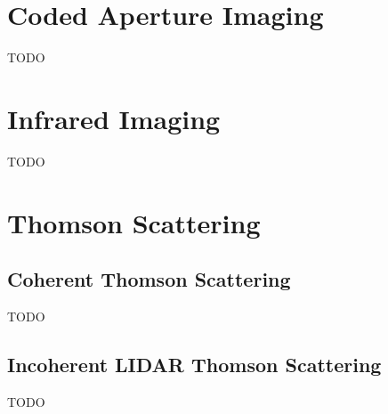 \documentclass{jpp}
\begin{document}
\section{Coded Aperture Imaging}

{\Large TODO \par}

\section{Infrared Imaging}

{\Large TODO \par}

\section{Thomson Scattering}

\subsection{Coherent Thomson Scattering}

{\Large TODO \par}

\subsection{Incoherent LIDAR Thomson Scattering}

{\Large TODO \par}


 
\end{document}
